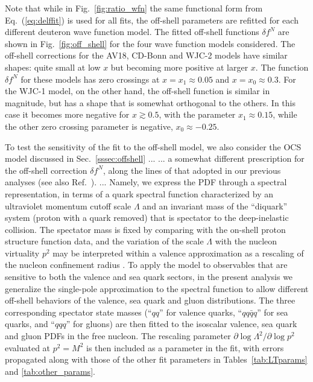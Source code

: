 \documentclass[aps,prd,amsmath,preprint]{revtex4}
\begin{document}
Note that while in Fig.~\ref{fig:ratio_wfn} the same functional form
from Eq.~(\ref{eq:delffit}) is used for all fits, the off-shell
parameters are refitted for each different deuteron wave function
model.  The fitted off-shell functions $\delta f^N$ are shown in
Fig.~\ref{fig:off_shell} for the four wave function models considered.
The off-shell corrections for the AV18, CD-Bonn and WJC-2 models have
similar shapes: quite small at low $x$ but becoming more positive at
larger $x$.  The function $\delta f^N$ for these models has zero
crossings at $x = x_1 \approx 0.05$ and $x = x_0 \approx 0.3$.
For the WJC-1 model, on the other hand, the off-shell function is
similar in magnitude, but has a shape that is somewhat orthogonal
to the others.  In this case it becomes more negative for
$x \gtrsim 0.5$, with the parameter $x_1 \approx 0.15$, while the
other zero crossing parameter is negative, $x_0 \approx -0.25$.


To test the sensitivity of the fit to the off-shell model, we also
consider the OCS model discussed in Sec.~\ref{sssec:offshell} ...
...
a somewhat different prescription for the off-shell
correction $\delta f^N$, along the lines of that adopted in our
previous analyses \cite{CJ11, CJ12} (see also Ref.~\cite{KP06}).
...
Namely, we express the PDF through a spectral representation, in
terms of a quark spectral function characterized by an ultraviolet
momentum cutoff scale $\Lambda$ and an invariant mass of the
``diquark'' system (proton with a quark removed) that is spectator
to the deep-inelastic collision.  The spectator mass is fixed by
comparing with the on-shell proton structure function data, and
the variation of the scale $\Lambda$ with the nucleon virtuality
$p^2$ may be interpreted within a valence approximation as a
rescaling of the nucleon confinement radius \cite{KP06}.
%
To apply the model to observables that are sensitive to both the
valence and sea quark sectors, in the present analysis we generalize
the single-pole approximation to the spectral function to allow
different off-shell behaviors of the valence, sea quark and gluon
distributions.  The three corresponding spectator state masses
(``$qq$'' for valence quarks, ``$qq\bar q q$'' for sea quarks,
and ``$qqq$'' for gluons) are then fitted to the isoscalar
valence, sea quark and gluon PDFs in the free nucleon.
The rescaling parameter $\partial \log\Lambda^2 / \partial \log p^2$
evaluated at $p^2=M^2$ is then included as a parameter in the fit,
with errors propagated along with those of the other fit parameters
in Tables~\ref{tab:LTparams} and \ref{tab:other_params}.
\end{document}
